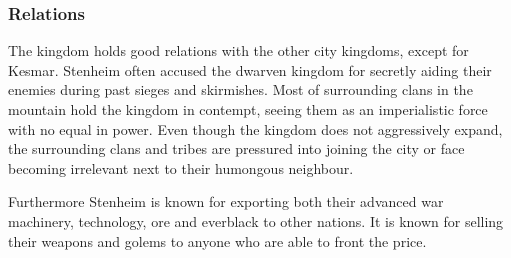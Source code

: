 \subsubsection{Relations}

The kingdom holds good relations with the other city kingdoms, except for
Kesmar. Stenheim often accused the dwarven kingdom for secretly aiding their
enemies during past sieges and skirmishes. Most of surrounding clans in the
mountain hold the kingdom in contempt, seeing them as an imperialistic force
with no equal in power. Even though the kingdom does not aggressively expand,
the surrounding clans and tribes are pressured into joining the city or face
becoming irrelevant next to their humongous neighbour.

Furthermore Stenheim is known for exporting both their advanced war machinery,
technology, ore and everblack to other nations. It is known for selling their
weapons and golems to anyone who are able to front the price.
